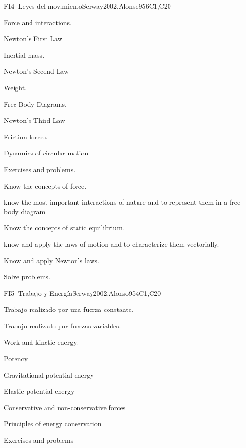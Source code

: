 \begin{syllabus}
\begin{unit}{FI4. Leyes del movimiento}{}{Serway2002,Alonso95}{6}{C1,C20}
\begin{topics}
      \item Force and interactions.
      \item Newton's First Law
      \item Inertial mass.
      \item Newton's Second Law
      \item Weight.
      \item Free Body Diagrams.
      \item Newton's Third Law
      \item Friction forces.
      \item Dynamics of circular motion
      \item Exercises and problems.
   \end{topics}

   \begin{learningoutcomes}
      \item Know the concepts of force.
      \item know the most important interactions of nature and to represent them in a free-body diagram
      \item Know the concepts of static equilibrium.
      \item know and apply the laws of motion and to characterize them vectorially.
      \item Know and apply Newton's laws.
      \item Solve problems.
   \end{learningoutcomes}
\end{unit}

\begin{unit}{FI5. Trabajo y Energí­a}{}{Serway2002,Alonso95}{4}{C1,C20}
\begin{topics}
	\item Trabajo realizado por una fuerza constante.
	\item Trabajo realizado por fuerzas variables.
	\item Work and kinetic energy.
	\item Potency
	\item Gravitational potential energy
	\item Elastic potential energy
	\item Conservative and non-conservative forces
	\item Principles of energy conservation
	\item Exercises and problems
\end{topics}


\end{unit}
\end{syllabus}
